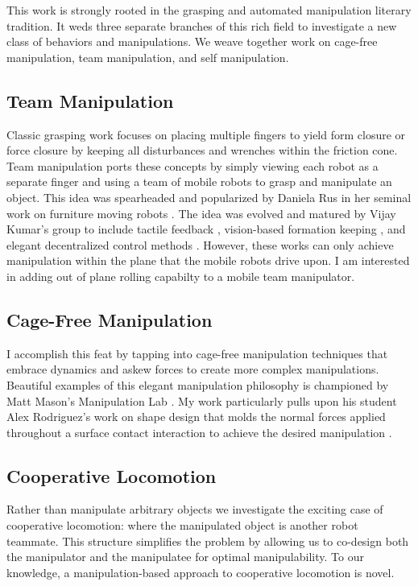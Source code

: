 \documentclass[letterpaper]{report}
\begin{document}
This work is strongly rooted in the grasping and automated manipulation literary tradition.
It weds three separate branches of this rich field to investigate a new class of behaviors and manipulations.
We weave together work on cage-free manipulation, team manipulation, and self manipulation.

\subsection{Team Manipulation}
Classic grasping work focuses on placing multiple fingers to yield form closure or force closure by keeping all disturbances and wrenches within the friction cone.
Team manipulation ports these concepts by simply viewing each robot as a separate finger and using a team of mobile robots to grasp and manipulate an object.
This idea was spearheaded and popularized by Daniela Rus in her seminal work on furniture moving robots \cite{rus1995moving}.
The idea was evolved and matured by Vijay Kumar's group to include tactile feedback \cite{sugar2002control}, vision-based formation keeping \cite{spletzer2001cooperative}, and elegant decentralized control methods \cite{song2002potential}.
However, these works can only achieve manipulation within the plane that the mobile robots drive upon.
I am interested in adding out of plane rolling capabilty to a mobile team manipulator.

\subsection{Cage-Free Manipulation}
I accomplish this feat by tapping into cage-free manipulation techniques that embrace dynamics and askew forces to create more complex manipulations.
Beautiful examples of this elegant manipulation philosophy is championed by Matt Mason's Manipulation Lab \cite{lynch1999dynamic}\cite{dafle2014extrinsic}.
My work particularly pulls upon his student Alex Rodriguez's work on shape design that molds the normal forces applied throughout a surface contact interaction to achieve the desired manipulation \cite{rodriguez2013effector}.

\subsection{Cooperative Locomotion}
Rather than manipulate arbitrary objects we investigate the exciting case of cooperative locomotion: where the manipulated object is another robot teammate.
This structure simplifies the problem by allowing us to co-design both the manipulator and the manipulatee for optimal manipulability.
To our knowledge, a manipulation-based approach to cooperative locomotion is novel.
\end{document}
